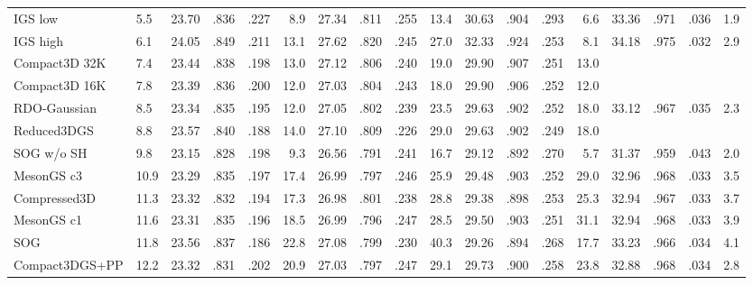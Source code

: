 {\begin{minipage}{\textheight}
\begin{adjustbox}{center}
\begin{tabular}{ll|lllr|lllr|lllr|lllr}
IGS low & 5.5 & 23.70 & .836 & .227 & \cellcolor{lightorange}8.9 & 27.34 & \cellcolor{lightyellow}.811 & .255 & \cellcolor{lightred}13.4 & \cellcolor{lightorange}30.63 & .904 & .293 & \cellcolor{lightyellow}6.6 & \cellcolor{lightyellow}33.36 & \cellcolor{lightorange}.971 & .036 & \cellcolor{lightorange}1.9 \\
IGS high & 6.1 & \cellcolor{lightorange}24.05 & \cellcolor{lightyellow}.849 & .211 & 13.1 & \cellcolor{lightorange}27.62 & \cellcolor{lightred}.820 & .245 & 27.0 & \cellcolor{lightred}32.33 & \cellcolor{lightred}.924 & .253 & 8.1 & \cellcolor{lightred}34.18 & \cellcolor{lightred}.975 & \cellcolor{lightred}.032 & 2.9 \\
Compact3D 32K & 7.4 & 23.44 & .838 & .198 & 13.0 & 27.12 & .806 & .240 & 19.0 & 29.90 & \cellcolor{lightyellow}.907 & .251 & 13.0 &  &  &  &  \\
Compact3D 16K & 7.8 & 23.39 & .836 & .200 & 12.0 & 27.03 & .804 & .243 & 18.0 & 29.90 & .906 & .252 & 12.0 &  &  &  &  \\
RDO-Gaussian & 8.5 & 23.34 & .835 & .195 & 12.0 & 27.05 & .802 & .239 & 23.5 & 29.63 & .902 & .252 & 18.0 & 33.12 & .967 & .035 & 2.3 \\
Reduced3DGS & 8.8 & 23.57 & .840 & .188 & 14.0 & 27.10 & .809 & \cellcolor{lightorange}.226 & 29.0 & 29.63 & .902 & \cellcolor{lightorange}.249 & 18.0 &  &  &  &  \\
SOG w/o SH & 9.8 & 23.15 & .828 & .198 & \cellcolor{lightyellow}9.3 & 26.56 & .791 & .241 & \cellcolor{lightyellow}16.7 & 29.12 & .892 & .270 & \cellcolor{lightorange}5.7 & 31.37 & .959 & .043 & \cellcolor{lightyellow}2.0 \\
MesonGS c3 & 10.9 & 23.29 & .835 & .197 & 17.4 & 26.99 & .797 & .246 & 25.9 & 29.48 & .903 & .252 & 29.0 & 32.96 & \cellcolor{lightyellow}.968 & \cellcolor{lightorange}.033 & 3.5 \\
Compressed3D & 11.3 & 23.32 & .832 & .194 & 17.3 & 26.98 & .801 & .238 & 28.8 & 29.38 & .898 & .253 & 25.3 & 32.94 & .967 & \cellcolor{lightorange}.033 & 3.7 \\
MesonGS c1 & 11.6 & 23.31 & .835 & .196 & 18.5 & 26.99 & .796 & .247 & 28.5 & 29.50 & .903 & .251 & 31.1 & 32.94 & \cellcolor{lightyellow}.968 & \cellcolor{lightorange}.033 & 3.9 \\
SOG & 11.8 & 23.56 & .837 & .186 & 22.8 & 27.08 & .799 & .230 & 40.3 & 29.26 & .894 & .268 & 17.7 & 33.23 & .966 & \cellcolor{lightyellow}.034 & 4.1 \\
Compact3DGS+PP & 12.2 & 23.32 & .831 & .202 & 20.9 & 27.03 & .797 & .247 & 29.1 & 29.73 & .900 & .258 & 23.8 & 32.88 & \cellcolor{lightyellow}.968 & \cellcolor{lightyellow}.034 & 2.8 \\

\end{tabular}
\end{adjustbox}
\end{minipage}}
